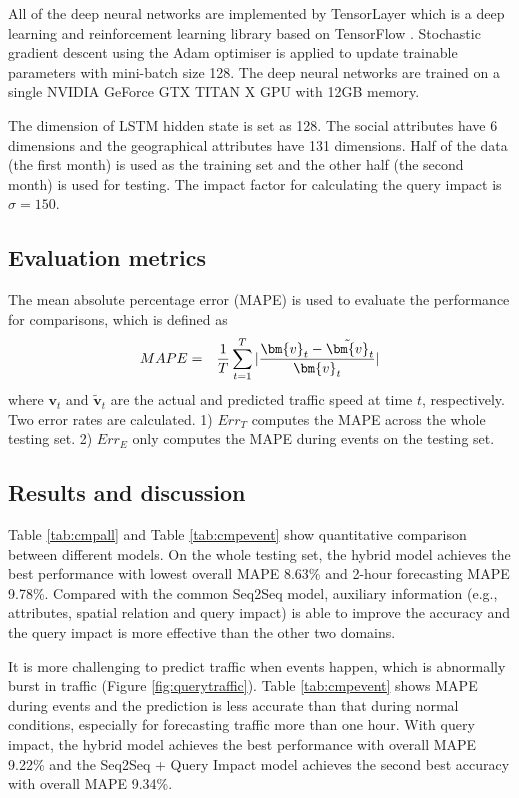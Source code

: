 All of the deep neural networks are implemented by TensorLayer  \cite{haoTL2017} which is a deep learning and reinforcement learning library based on TensorFlow  \cite{abadi2016tensorflow}. Stochastic gradient descent using the Adam optimiser  \cite{kingma2014adam} is applied to update trainable parameters with mini-batch size 128. The deep neural networks are trained on a single NVIDIA GeForce GTX TITAN X GPU with 12GB memory.

The dimension of LSTM hidden state is set as 128. The social attributes have 6 dimensions and the geographical attributes have 131 dimensions. Half of the data  (the first month) is used as the training set and the other half (the second month) is used for testing. The impact factor for calculating the query impact is $\sigma=150$.




\subsection{Evaluation metrics}
\label{metrics}
The mean absolute percentage error  (MAPE) is used to evaluate the performance for comparisons, which is defined as
\begin{eqnarray}
MAPE &=& \frac{1}{T} \sum_{t=1}^{T}{\arrowvert \frac{\bm{v}_t - \tilde{\bm{v}}_t}{\bm{v}_t} \arrowvert}
\end{eqnarray}
where $\bm{v}_t$ and $\tilde{\bm{v}}_t$ are the actual and predicted traffic speed at time $t$, respectively. Two error rates are calculated. 1) $Err_T$ computes the MAPE across the whole testing set. 2) $Err_E$ only computes the MAPE during events on the testing set.

\subsection{Results and discussion}
\label{results}

Table \ref{tab:cmpall} and Table \ref{tab:cmpevent} show quantitative comparison between different models. On the whole testing set, the hybrid model achieves the best performance with lowest overall MAPE 8.63\% and 2-hour forecasting MAPE 9.78\%. Compared with the common Seq2Seq model, auxiliary information (e.g., attributes, spatial relation and query impact) is able to improve the accuracy and the query impact is more effective than the other two domains.

It is more challenging to predict traffic when events happen, which is abnormally burst in traffic (Figure \ref{fig:querytraffic}). Table \ref{tab:cmpevent} shows MAPE during events and the prediction is less accurate than that during normal conditions, especially for forecasting traffic more than one hour. With query impact, the hybrid model achieves the best performance with overall MAPE 9.22\% and the Seq2Seq + Query Impact model achieves the second best accuracy with overall MAPE 9.34\%.

